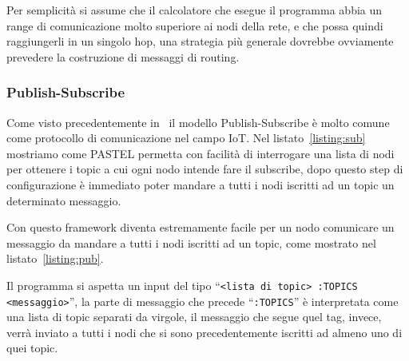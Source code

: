 \documentclass[10pt]{article}
\begin{document}
Per semplicità si assume che il calcolatore che esegue il programma abbia un range di comunicazione molto superiore ai nodi della rete, e che possa quindi raggiungerli in un singolo hop, una strategia più generale dovrebbe ovviamente prevedere la costruzione di messaggi di routing.



\subsubsection{Publish-Subscribe}\label{subsubsection:pub-sub}

Come visto precedentemente in~\cite{tandale2017empirical} il modello Publish-Subscribe è molto comune come protocollo di comunicazione nel campo IoT. Nel listato~\ref{listing:sub} mostriamo come PASTEL permetta con facilità di interrogare una lista di nodi per ottenere i topic a cui ogni nodo intende fare il subscribe, dopo questo step di configurazione è immediato poter mandare a tutti i nodi iscritti ad un topic un determinato messaggio.





Con questo framework diventa estremamente facile per un nodo comunicare un messaggio da mandare a tutti i nodi iscritti ad un topic, come mostrato nel listato~\ref{listing:pub}.

Il programma si aspetta un input del tipo ``\texttt{<lista di topic> :TOPICS <messaggio>}'', la parte di messaggio che precede ``\texttt{:TOPICS}'' è interpretata come una lista di topic separati da virgole, il messaggio che segue quel tag, invece, verrà inviato a tutti i nodi che si sono precedentemente iscritti ad almeno uno di quei topic.


\end{document}
